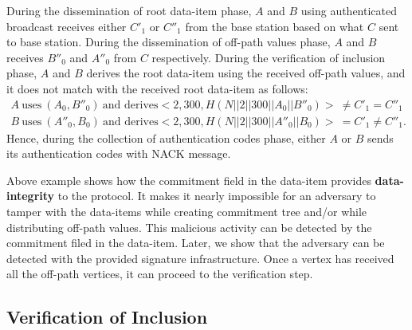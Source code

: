 \begin{exmp}
			During the dissemination of root data-item phase, $A$ and $B$ using authenticated broadcast receives either $C'_{1}$ or $C''_{1}$ from the base station based on what $C$ sent to base station.
			During the dissemination of off-path values phase, $A$ and $B$ receives $B''_{0}$ and $A''_{0}$ from $C$ respectively.
			During the verification of inclusion phase, $A$ and $B$ derives the root data-item using the received off-path values, and it does not match with the received root data-item as follows:
			\begin{equation}
				\begin{array}{l}
					A\ \mbox{uses}\ (A_{0}, B''_{0})\ \mbox{and derives} <2,300,H(N||2||300||A_{0}||B''_{0})>\  \neq C'_{1} = C''_{1}\\
					B\ \mbox{uses}\ (A''_{0}, B_{0})\ \mbox{and derives} <2,300,H(N||2||300||A''_{0}||B_{0})>\  = C'_{1} \neq C''_{1}.
				\end{array}
			\end{equation}
			Hence, during the collection of authentication codes phase, either $A$ or $B$ sends its authentication codes with NACK message.
		\end{exmp}
			Above example shows how the commitment field in the data-item provides \textbf{data-integrity} to the protocol.
			It makes it nearly impossible for an adversary to tamper with the data-items while creating commitment tree and/or while distributing off-path values.
			This malicious activity can be detected by the commitment filed in the data-item.
			Later, we show that the adversary can be detected with the provided signature infrastructure.
			Once a vertex has received all the off-path vertices, it can proceed to the verification step.
	
	\subsection{Verification of Inclusion}
	
